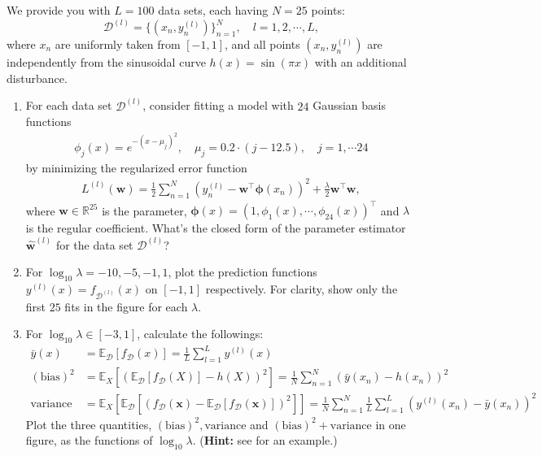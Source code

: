 \documentclass[11pt,letter,notitlepage]{article}
\begin{document}
\newpage
\begin{exercise}\label{BiasVariance}
    We provide you with $L=100$ data sets, each having $N=25$ points:
    $$
    \mathcal{D}^{(l)}=\{ (x_n,y_n^{(l)})\}_{n=1}^N,\quad l=1,2,\cdots ,L,
    $$
    where $x_n$ are uniformly taken from $[-1,1]$, and all points $(x_n, y_n^{(l)})$ are independently from the sinusoidal curve $h(x)=\sin (\pi x)$ with an additional disturbance.
    \begin{enumerate}
        \item For each data set $\mathcal{D}^{(l)}$, consider fitting a model with $24$ Gaussian basis functions
        \begin{align*}
            \phi_j(x)= e^{-(x-\mu_j)^2},\quad \mu_j = 0.2 \cdot (j-12.5),\quad j = 1,\cdots 24
        \end{align*}
        by minimizing the regularized error function
        \begin{align*}
            L^{(l)}(\mathbf{w}) = \frac{1}{2}\sum_{n=1}^N (y^{(l)}_n - \mathbf{w}^\top \bm{\phi}(x_n))^2 + \frac{\lambda}{2}\mathbf{w}^\top\mathbf{w},
        \end{align*}
        where $\mathbf{w}\in\mathbb{R}^{25}$ is the parameter, $\bm{\phi}(x)=(1, \phi_1(x),\cdots,\phi_{24}(x))^\top$ and $\lambda$ is the regular coefficient. What's the closed form of the parameter estimator $\hat{\mathbf{w}}^{(l)}$ for the data set $\mathcal{D}^{(l)}$?

        \item For $\log_{10}\lambda = -10, -5,-1,1$, plot the prediction functions $y^{(l)}(x)=f_{\mathcal{D}^{(l)}}(x)$ on $[-1,1]$ respectively. For clarity, show only the first $25$ fits in the figure for each $\lambda$.

        \item For $\log_{10}\lambda\in [-3,1]$, calculate the followings:
        \begin{align*}
            \bar{y}(x)& =\mathbb{E}_{\mathcal{D}}[f_{\mathcal{D}}(x)]=\frac{1}{L}\sum_{l=1}^L y^{(l)}(x) \\
            (\mbox{bias})^2& =\mathbb{E}_X[(\mathbb{E}_{\mathcal{D}}[f_{\mathcal{D}}(X)]-h(X))^2]=\frac{1}{N}\sum_{n=1}^N (\bar{y}(x_n)-h(x_n))^2\\
            \mbox{variance} &= \mathbb{E}_X[\mathbb{E}_{\mathcal{D}}[(f_{\mathcal{D}}(\mathbf{x})-\mathbb{E}_{\mathcal{D}}[f_{\mathcal{D}}(\mathbf{x})])^2]] = \frac{1}{N}\sum_{n=1}^N\frac{1}{L}\sum_{l=1}^L (y^{(l)}(x_n)-\bar{y}(x_n))^2
        \end{align*}
        Plot the three quantities, $(\mbox{bias})^2, \mbox{variance}$ and $(\mbox{bias})^2 + \mbox{variance}$ in one figure, as the functions of $\log_{10}\lambda$.
        (\textbf{Hint:} see \cite{Bishop2006} for an example.)
    \end{enumerate}

\end{exercise}
\end{document}
